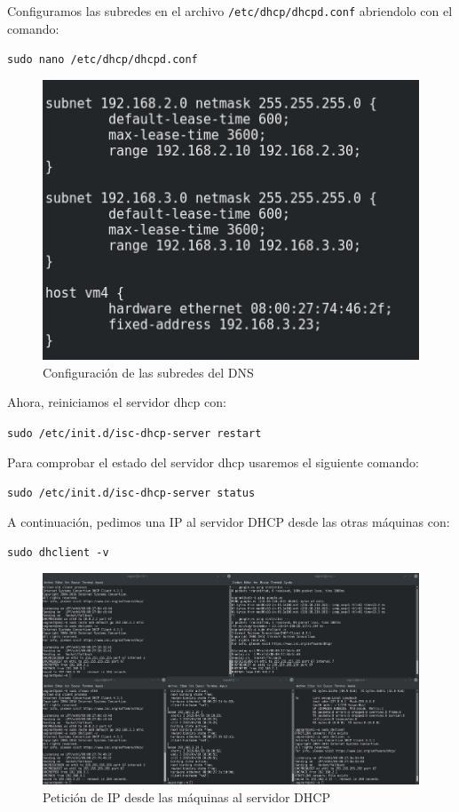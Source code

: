 \documentclass[12pt,letterpaper]{article}
\begin{document}
Configuramos las subredes en el archivo \texttt{/etc/dhcp/dhcpd.conf} abriendolo con el comando:
\begin{center}
	\texttt{sudo nano /etc/dhcp/dhcpd.conf}
\end{center}
\begin{figure}[h]
	\centering
	\includegraphics[scale=0.8]{DHCP2.png}
	\caption{Configuración de las subredes del DNS}
\end{figure}

Ahora, reiniciamos el servidor dhcp con:
\begin{center}
	\texttt{sudo /etc/init.d/isc-dhcp-server restart}
\end{center}

Para comprobar el estado del servidor dhcp usaremos el siguiente comando:
\begin{center}
	\texttt{sudo /etc/init.d/isc-dhcp-server status}
\end{center}

A continuación, pedimos una IP al servidor DHCP desde las otras máquinas con:
\begin{center}
	\texttt{sudo dhclient -v}
\end{center}
\newpage
\begin{figure}[h]
	\centering
	\includegraphics[scale=0.25]{DHCP1.png}
	\caption{Petición de IP desde las máquinas al servidor DHCP}
\end{figure}
\end{document}
